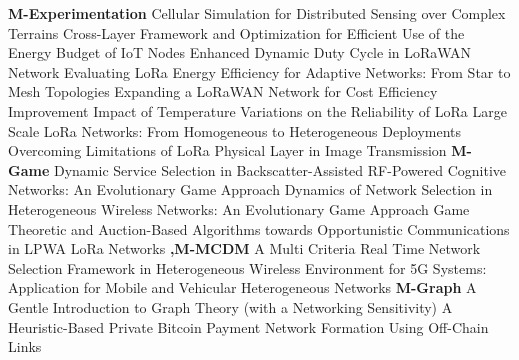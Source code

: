 \textbf{M-Experimentation} \newline  \cite{truong_cellular_2018} Cellular {{Simulation}} for {{Distributed Sensing}} over {{Complex Terrains}} \newline 
 \cite{callebaut_cross-layer_2018} Cross-Layer Framework and Optimization for Efficient Use of the Energy Budget of {{IoT Nodes}} \newline 
 \cite{montavont_enhanced_2018} Enhanced {{Dynamic Duty Cycle}} in {{LoRaWAN Network}} \newline 
 \cite{ochoa_evaluating_2017} Evaluating {{LoRa}} Energy Efficiency for Adaptive Networks: {{From}} Star to Mesh Topologies \newline 
 \cite{jurado_cortes_expanding_2018} Expanding a {{LoRaWAN}} Network for Cost Efficiency Improvement \newline 
 \cite{boano_impact_2018} Impact of {{Temperature Variations}} on the {{Reliability}} of {{LoRa}} \newline 
 \cite{ochoa_large_2018} Large {{Scale LoRa Networks}}: {{From Homogeneous}} to {{Heterogeneous Deployments}} \newline 
 \cite{jebril_overcoming_2018} Overcoming {{Limitations}} of {{LoRa Physical Layer}} in {{Image Transmission}} \newline 
\textbf{M-Game} \newline  \cite{gao_dynamic_2019} Dynamic {{Service Selection}} in {{Backscatter}}-{{Assisted RF}}-{{Powered Cognitive Networks}}: {{An Evolutionary Game Approach}} \newline 
 \cite{niyato_dynamics_2009} Dynamics of {{Network Selection}} in {{Heterogeneous Wireless Networks}}: {{An Evolutionary Game Approach}} \newline 
 \cite{haghighi_game_2016} Game Theoretic and Auction-Based Algorithms towards Opportunistic Communications in {{LPWA LoRa}} Networks \newline 
\textbf{,M-MCDM} \newline  \cite{drissi_multi_2017} A {{Multi Criteria Real Time Network Selection Framework}} in {{Heterogeneous Wireless Environment}} for {{5G}} Systems: {{Application}} for {{Mobile}} and {{Vehicular Heterogeneous Networks}} \newline 
\textbf{M-Graph} \newline  \cite{casteigts_gentle_nodate} A {{Gentle Introduction}} to {{Graph Theory}} (with a Networking Sensitivity) \newline 
 \cite{erdin_heuristic-based_2019} A {{Heuristic}}-{{Based Private Bitcoin Payment Network Formation Using Off}}-{{Chain Links}} \newline 
